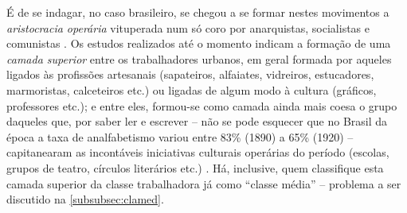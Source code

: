 É de se indagar, no caso brasileiro, se chegou a se formar nestes movimentos a \textit{aristocracia operária} vituperada num só coro por anarquistas, socialistas e comunistas \cite{bakunin_contramarx_2015,engels_1892pref_1990,lenin_imperialismo_1987}. Os estudos realizados até o momento indicam a formação de uma \textit{camada superior} entre os trabalhadores urbanos, em geral formada por aqueles ligados às profissões artesanais (sapateiros, alfaiates, vidreiros, estucadores, marmoristas, calceteiros etc.) ou ligadas de algum modo à cultura (gráficos, professores etc.); e entre eles, formou-se como camada ainda mais coesa o grupo daqueles que, por saber ler e escrever -- não se pode esquecer que no Brasil da época a taxa de analfabetismo variou entre 83\% (1890) a 65\% (1920) -- capitanearam as incontáveis iniciativas culturais operárias do período (escolas, grupos de teatro, círculos literários etc.) \cite{gomes_velhos_1988,goes_formacao_1988,hardman_patripatr_2002,pinheiro_prolind_1977}. Há, inclusive, quem classifique esta camada superior da classe trabalhadora já como ``classe média'' -- problema a ser discutido na \autoref{subsubsec:clamed}.

